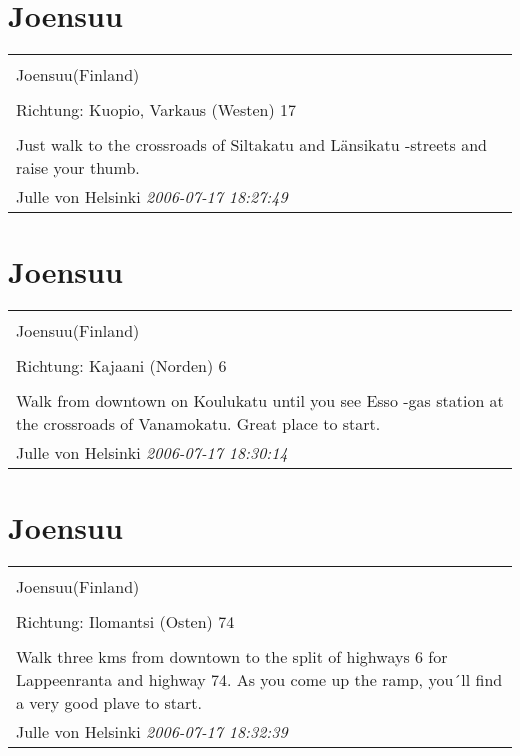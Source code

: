 \documentclass[a4paper,12pt]{article}
\begin{document}
\section{Joensuu}
\begin{tabular}{|p{13cm}|}
\hline\\
Joensuu(Finland)\\
\\
Richtung: Kuopio, Varkaus (Westen) 17 \\
\hline\\
Just walk to the crossroads of Siltakatu and Länsikatu -streets and raise your thumb. \\
Julle von Helsinki \textit{ 2006-07-17 18:27:49 }\\\hline
\end{tabular}


\section{Joensuu}
\begin{tabular}{|p{13cm}|}
\hline\\
Joensuu(Finland)\\
\\
Richtung: Kajaani (Norden) 6 \\
\hline\\
Walk from downtown on Koulukatu until you see Esso -gas station at the crossroads of Vanamokatu. Great place to start. \\
Julle von Helsinki \textit{ 2006-07-17 18:30:14 }\\\hline
\end{tabular}


\section{Joensuu}
\begin{tabular}{|p{13cm}|}
\hline\\
Joensuu(Finland)\\
\\
Richtung: Ilomantsi (Osten) 74 \\
\hline\\
Walk three kms from downtown to the split of highways 6 for Lappeenranta and highway 74. As you come up the ramp, you´ll find a very good plave to start. \\
Julle von Helsinki \textit{ 2006-07-17 18:32:39 }\\\hline
\end{tabular}
\end{document}
